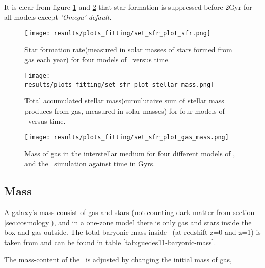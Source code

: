 It is clear from figure \ref{img:fit-v0-sfr} and \ref{img:fit-v0-stellarmass} that star-formation is suppressed before 2Gyr for all models except \textit{'Omega' default}.

\begin{figure}[b]
  \centering
  \texttt{[image: results/plots\_fitting/set\_sfr\_plot\_sfr.png]}
  \caption[Star formation rate in \omegamodel\ for \insertion]{\label{img:fit-v0-sfr}
    Star formation rate(measured in solar masses of stars formed from gas each year) for four models of \omegamodel\ versus time. 
  }
\end{figure}
\begin{figure}[b]
  \centering
  \texttt{[image: results/plots\_fitting/set\_sfr\_plot\_stellar\_mass.png]}
  \caption[Stellar mass in \omegamodel\ for \insertion]{\label{img:fit-v0-stellarmass}
    Total accumulated stellar mass(cumulutaive sum of stellar mass produces from gas, measured in solar masses) for four models of \omegamodel\ versus time.
  }
\end{figure}
\begin{figure}[b]
  \centering
  \texttt{[image: results/plots\_fitting/set\_sfr\_plot\_gas\_mass.png]}
  \caption[Gas mass in \omegamodel for \insertion]{\label{img:fit-v0-gasmass}
    Mass of gas in the interstellar medium for four different models of \omegamodel, and the \eris\ simulation against time in Gyrs.
  }
\end{figure}
\FloatBarrier

\subsection{Mass}
A galaxy's mass consist of gas and stars (not counting dark matter from section \ref{sec:cosmology}), and in a one-zone model there is only gas and stars inside the box and gas outside.
The total baryonic mass inside \eris\ (at redshift z=0 and z=1) is taken from  and can be found in table \ref{tab:guedes11-baryonic-mass}.



The mass-content of the \fiduccialomega\ is adjusted by changing the initial mass of gas, 

